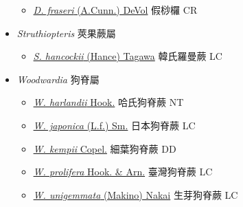 \begin{itemize}
  \begin{itemize}
        \item[] \href{http://www.theplantlist.org/tpl1.1/search?q=Diploblechnum+fraseri}{\textit{D. fraseri} (A.Cunn.) DeVol}   假桫欏 CR
  \end{itemize}
 \item[] \textit{Struthiopteris} 莢果蕨屬
                    
  \begin{itemize}
        \item[] \href{http://www.theplantlist.org/tpl1.1/search?q=Struthiopteris+hancockii}{\textit{S. hancockii} (Hance) Tagawa}   韓氏羅曼蕨 LC
  \end{itemize}
 \item[] \textit{Woodwardia} 狗脊屬
                    
  \begin{itemize}
        \item[] \href{http://www.theplantlist.org/tpl1.1/search?q=Woodwardia+harlandii}{\textit{W. harlandii} Hook.}   哈氏狗脊蕨 NT
        \item[] \href{http://www.theplantlist.org/tpl1.1/search?q=Woodwardia+japonica}{\textit{W. japonica} (L.f.) Sm.}   日本狗脊蕨 LC
        \item[] \href{http://www.theplantlist.org/tpl1.1/search?q=Woodwardia+kempii}{\textit{W. kempii} Copel.}   細葉狗脊蕨 DD
        \item[] \href{http://www.theplantlist.org/tpl1.1/search?q=Woodwardia+prolifera}{\textit{W. prolifera} Hook. \& Arn.}     臺灣狗脊蕨 LC
        \item[] \href{http://www.theplantlist.org/tpl1.1/search?q=Woodwardia+unigemmata}{\textit{W. unigemmata} (Makino) Nakai}   生芽狗脊蕨 LC
  \end{itemize}
  \end{itemize}
